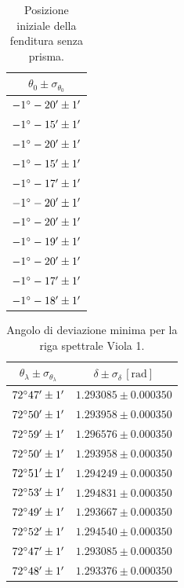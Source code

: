 \documentclass[]{article}
\begin{document}
    \begin{table}[H]
        \centering
        \begin{tabular}{||c||}
            \hline
            $\theta_0 \pm \sigma_{\theta_0}$ \\\hline
            \hline
            $-1\degree -20' \pm 1'$ \\\hline
            $-1\degree -15' \pm 1'$ \\\hline
            $-1\degree -20' \pm 1'$ \\\hline
            $-1\degree -15' \pm 1'$ \\\hline
            $-1\degree -17' \pm 1'$ \\\hline
            $-1\degree -20' \pm 1'$ \\\hline
            $-1\degree -20' \pm 1'$ \\\hline
            $-1\degree -19' \pm 1'$ \\\hline
            $-1\degree -20' \pm 1'$ \\\hline
            $-1\degree -17' \pm 1'$ \\\hline
            $-1\degree -18' \pm 1'$ \\\hline
        \end{tabular}
        \caption{Posizione iniziale della fenditura senza prisma.}
        \label{theta-0}
    \end{table}

    \begin{table}[H]
        \centering
        \begin{tabular}{||c|c||}
            \hline
            $\theta_{\lambda} \pm \sigma_{\theta_{\lambda}}$ & $\delta \pm \sigma_{\delta} \,\left[\text{rad}\right]$ \\\hline
            \hline
            $72\degree 47' \pm 1'$ & $1.293085 \pm 0.000350$ \\\hline
            $72\degree 50' \pm 1'$ & $1.293958 \pm 0.000350$ \\\hline
            $72\degree 59' \pm 1'$ & $1.296576 \pm 0.000350$ \\\hline
            $72\degree 50' \pm 1'$ & $1.293958 \pm 0.000350$ \\\hline
            $72\degree 51' \pm 1'$ & $1.294249 \pm 0.000350$ \\\hline
            $72\degree 53' \pm 1'$ & $1.294831 \pm 0.000350$ \\\hline
            $72\degree 49' \pm 1'$ & $1.293667 \pm 0.000350$ \\\hline
            $72\degree 52' \pm 1'$ & $1.294540 \pm 0.000350$ \\\hline
            $72\degree 47' \pm 1'$ & $1.293085 \pm 0.000350$ \\\hline
            $72\degree 48' \pm 1'$ & $1.293376 \pm 0.000350$ \\\hline
        \end{tabular}
        \caption{Angolo di deviazione minima per la riga spettrale Viola 1.}
        \label{viola-1}
    \end{table}
\end{document}
